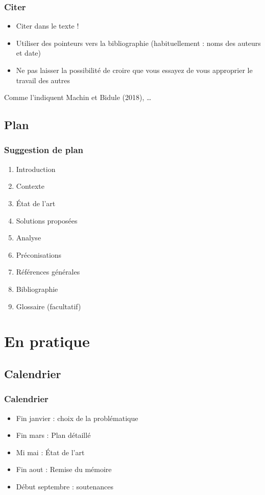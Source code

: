 \documentclass[french]{beamer}
\begin{document}
\begin{frame}
	\frametitle{Citer}
	\begin{itemize}
		\item Citer dans le texte !
		\item Utiliser des pointeurs vers la bibliographie (habituellement : noms des auteurs et date)
		\item Ne pas laisser la possibilité de croire que vous essayez de vous approprier le travail des autres
	\end{itemize}
	\begin{example}[Pointeur]
		Comme l’indiquent Machin et Bidule (2018), …
	\end{example}
\end{frame}

\subsection{Plan}
\begin{frame}
	\frametitle{Suggestion de plan}
	\begin{enumerate}
		\item Introduction
		\item Contexte
		\item État de l’art
		\item Solutions proposées
		\item Analyse
		\item Préconisations
		\item Références générales
		\item Bibliographie
		\item Glossaire (facultatif)
	\end{enumerate}
\end{frame}

\section{En pratique}
\subsection{Calendrier}
\begin{frame}
	\frametitle{Calendrier}
	\begin{itemize}
		\item Fin janvier : choix de la problématique
		\item Fin mars : Plan détaillé
		\item Mi mai : État de l’art
		\item Fin aout : Remise du mémoire
		\item Début septembre : soutenances
	\end{itemize}
\end{frame}
\end{document}
